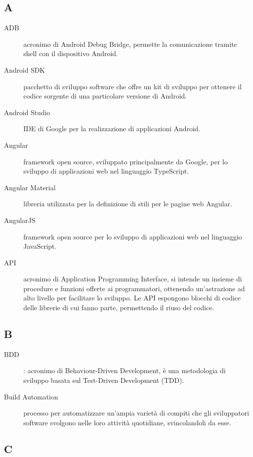 \documentclass[../manuale-manutentore.tex]{subfiles}
\begin{document}
\subsection{A}

\begin{description}
    \item[ADB] acronimo di Android Debug Bridge, permette la comunicazione tramite shell con il dispositivo Android.
    \item[Android SDK] pacchetto di sviluppo software che offre un kit di sviluppo per ottenere il codice sorgente di una particolare versione di Android.
    \item[Android Studio] IDE di Google per la realizzazione di applicazioni Android.
    \item[Angular] framework open source, sviluppato principalmente da Google, per lo sviluppo di applicazioni web nel linguaggio TypeScript.
    \item[Angular Material] libreria utilizzata per la definizione di stili per le pagine web Angular.
    \item[AngularJS] framework open source per lo sviluppo di applicazioni web nel linguaggio JavaScript.
    \item[API] acronimo di Application Programming Interface, si intende un insieme di procedure e funzioni offerte ai programmatori, ottenendo un'astrazione ad alto livello per facilitare lo sviluppo. Le API espongono blocchi di codice delle librerie di cui fanno parte, permettendo il riuso del codice.
\end{description}

\subsection{B}
\begin{description}
    \item[BDD]: acronimo di Behaviour-Driven Development, è una metodologia di sviluppo basata sul Test-Driven Development (TDD).
    \item[Build Automation] processo per automatizzare un'ampia varietà di compiti che gli sviluppatori software svolgono nelle loro attività quotidiane, svincolandoli da esse.
\end{description}

\subsection{C}
\end{document}
